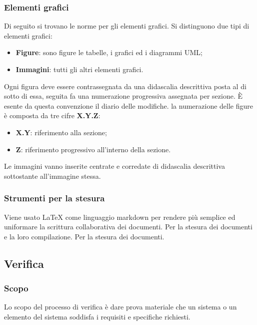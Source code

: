 	    \subsubsection{Elementi grafici}
	    Di seguito si trovano le norme per gli elementi grafici. Si distinguono due tipi di elementi grafici:
	    \begin{itemize}
	        \item \textbf{Figure}: sono figure le tabelle, i grafici ed i diagrammi UML;
	        \item \textbf{Immagini}: tutti gli altri elementi grafici. 
	    \end{itemize}
	    Ogni figura deve essere contrassegnata da una didascalia descrittiva posta al di sotto di essa, seguita fa una numerazione progressiva assegnata per sezione. È esente da questa convenzione il diario delle modifiche.
	    la numerazione delle figure è composta da tre cifre \textbf{X.Y.Z}:
	    \begin{itemize}
	        \item \textbf{X.Y}: riferimento alla sezione;
	        \item \textbf{Z}: riferimento progressivo all'interno della sezione.
	    \end{itemize}
	    Le immagini vanno inserite centrate e corredate di didascalia descrittiva sottostante all'immagine stessa.
	    \subsubsection{Strumenti per la stesura}
	    Viene usato LaTeX come linguaggio markdown per rendere più semplice ed uniformare la scrittura collaborativa dei documenti.
	    Per la stesura dei documenti e la loro compilazione.
	    Per la stesura dei documenti.
	\subsection{Verifica}
	\subsubsection{Scopo}
	Lo scopo del processo di verifica è dare prova materiale che un sistema o un elemento del sistema soddisfa i requisiti e specifiche richiesti.
